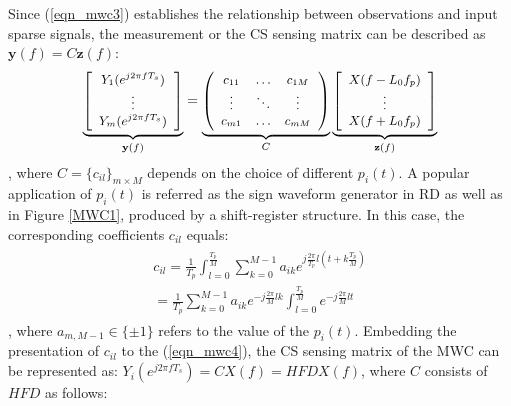 Since (\ref{eqn_mwc3}) establishes the relationship between observations and input sparse signals, the measurement or the CS sensing matrix can be described as $\mathbf y(f) = C \mathbf z(f)$:
\begin{align}
\label{eqn_mwc4}
\underbrace{\left[\small
\begin{array}[c]{c}
Y_1(e^{j2\pi fT_s}) \\
\vdots  \\
Y_m(e^{j2\pi fT_s})
\end{array}
\right]}_{\mathbf y(f)} =
\underbrace{\left(\small
\begin{array}[c]{ccc}
 c_{11} & \ldots & c_{1M} \\
 \vdots &  \ddots & \vdots\\   
 c_{m1}& \ldots & c_{mM}
\end{array}
\right)}_{C}
\underbrace{\left[\small
\begin{array}[c]{c}
X(f-{L_0}f_p) \\
\vdots  \\
X(f+{L_0}f_p)
\end{array}
\right]}_{\mathbf z(f)}
\end{align}
, where $C = \{c_{il}\}_{m \times M}$ depends on the choice of different $p_i(t)$. A popular application of $p_i(t)$ is referred as the sign waveform generator in RD\cite{mishali2010theory} as well as in Figure \ref{MWC1}, produced by a shift-register structure. In this case, the corresponding coefficients $c_{il}$ equals:
\begin{equation}
\begin{split}
\begin{aligned}
c_{il}= \frac{1}{T_p} \int_{l=0}^{\frac{T_p}{M}} \sum_{k=0}^{M-1} a_{ik} e^{j \frac{2\pi}{T_p} l (t+k \frac{T_p}{M})} \\
      = \frac{1}{T_p} \sum_{k=0}^{M-1} a_{ik} e^{-j \frac{2\pi}{M} lk } \int_{l=0}^{\frac{T_p}{M}} e^{-j \frac{2\pi}{M} lt }
\end{aligned}
\end{split}
\label{eqn_mwc5}
\end{equation}
, where $a_{m,M-1} \in \{\pm1\}$ refers to the value of the $p_i(t)$. Embedding the presentation of $c_{il}$ to the (\ref{eqn_mwc4}), the CS sensing matrix of the MWC can be represented as: $Y_i(e^{j2\pi fT_s})= CX(f) = HFDX(f)$, where $C$ consists of $HFD$ as follows:
